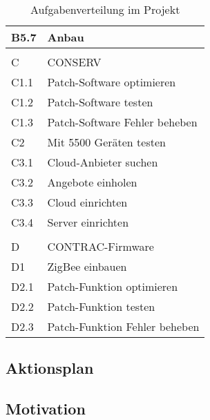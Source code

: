 \begin{table}[H]
\begin{center}
\begin{tabular}{l|l}
            B5.7 & Anbau                                               \\ \hline
            &                                                     \\ \hline
            C    & CONSERV                                             \\ \hline
            C1.1 & Patch-Software optimieren                           \\ \hline
            C1.2 & Patch-Software testen                               \\ \hline
            C1.3 & Patch-Software Fehler beheben                       \\ \hline
            C2   & Mit 5500 Geräten testen                             \\ \hline
            C3.1 & Cloud-Anbieter suchen                               \\ \hline
            C3.2 & Angebote einholen                                   \\ \hline
            C3.3 & Cloud einrichten                                    \\ \hline
            C3.4 & Server einrichten                                   \\ \hline
            &                                                     \\ \hline
            D    & CONTRAC-Firmware                                    \\ \hline
            D1   & ZigBee einbauen                                     \\ \hline
            D2.1 & Patch-Funktion optimieren                           \\ \hline
            D2.2 & Patch-Funktion testen                               \\ \hline
            D2.3 & Patch-Funktion Fehler beheben                       \\
        \end{tabular}
        \caption{Aufgabenverteilung im Projekt}
    \end{center}
\end{table}
\subsection{Aktionsplan}



\subsection{Motivation} %



